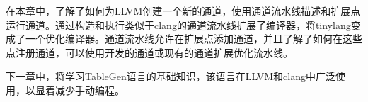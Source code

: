 在本章中，了解了如何为LLVM创建一个新的通道，使用通道流水线描述和扩展点运行通道。通过构造和执行类似于clang的通道流水线扩展了编译器，将tinylang变成了一个优化编译器。通道流水线允许在扩展点添加通道，并且了解了如何在这些点注册通道，可以使用开发的通道或现有的通道扩展优化流水线。

下一章中，将学习TableGen语言的基础知识，该语言在LLVM和clang中广泛使用，以显着减少手动编程。